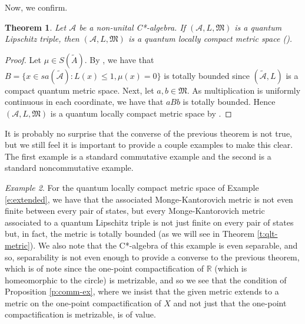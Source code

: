 \documentclass{amsart}
\theoremstyle{plain}
\newtheorem{theorem}{Theorem}[section]
\theoremstyle{definition}
\theoremstyle{remark}
\newtheorem{example}[theorem]{Example}
\numberwithin{equation}{section}
\newcommand{\A}{{\mathcal{A}}}
\newcommand{\wt}[1]{{\widetilde{#1}}}
\newcommand{\R}{{\mathds{R}}}
\newcommand{\M}{{\mathfrak{M}}}
\renewcommand{\leq}{\leqslant}
\begin{document}
Now, we confirm.
\begin{theorem}\label{t:q-l-triple-qlcms}
      Let $\A$ be a non-unital C*-algebra. If  $(\A, L,\M)$ is a quantum Lipschitz triple, then $(\A, L,\M)$ is a quantum locally compact metric space (\cite[Definition 3.1]{Latremoliere12b}).
\end{theorem}
\begin{proof}
    Let $\mu\in S(\wt{A})$.  By \cite[Proposition 1.3]{Ozawa05},  we have that 
    $B=\{x\in sa(\wt{\A}): L(x)\leq 1, \mu(x)=0\}$ is totally bounded since $(\wt{\A}, L)$ is a compact quantum metric space. Next, let $a,b\in \M$. As multiplication is uniformly continuous in each coordinate, we have that $aBb$ is totally bounded. Hence $(\A, L,\M)$ is a quantum locally compact metric space by \cite[Theorem 3.10]{Latremoliere12b}.
\end{proof}
 It is probably no surprise that the converse of the previous theorem is not true, but we still feel it is important to provide a couple examples to make this clear. The first example is a standard commutative example and the second is a standard noncommutative example.
\begin{example}\label{e:non-qlt-comm}
   For the quantum locally compact metric space of Example \ref{e:extended}, we have that  the  associated Monge-Kantorovich metric is not even finite between every pair of states, but every Monge-Kantorovich metric associated to a quantum Lipschitz triple is not just finite on every pair of states but, in fact, the metric is totally bounded (as we will see in Theorem \ref{t:qlt-metric}). We also note that the C*-algebra of this example is even separable, and so, separability is not even enough to provide a converse to the previous theorem, which is of note since the one-point compactification of $\R$ (which is homeomorphic to the circle) is metrizable, and so we see that the condition of Proposition \ref{p:comm-ex}, where we insist that the given metric extends to a metric on the one-point compactification of $X$ and not just that the one-point compactification is metrizable, is of value.
   \end{example}
\end{document}
